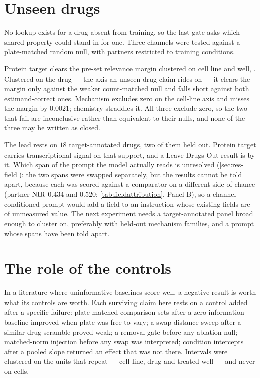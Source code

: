 \section{Unseen drugs}

No lookup exists for a drug absent from training, so the last gate asks which
shared property could stand in for one. Three channels were tested against a
plate-matched random null, with partners restricted to training conditions.

Protein target clears the pre-set relevance margin clustered on cell line and
well, . Clustered on the drug --- the axis an
unseen-drug claim rides on --- it clears the margin only against the weaker
count-matched null and falls short against both estimand-correct ones. Mechanism
excludes zero on the cell-line axis and misses the margin by $0.0021$; chemistry
straddles it. All three exclude zero, so the two that fail are inconclusive
rather than equivalent to their nulls, and none of the three may be written as
closed.

The lead rests on $18$ target-annotated drugs, two of them held out. Protein
target carries transcriptional signal on that support, and a Leave-Drugs-Out
result is \notestablished by it. Which span of the prompt the model actually
reads is unresolved (\cref{sec:res-field}): the two spans were swapped separately, but the results cannot be told apart, because each was scored against a comparator on a different side of chance (partner $\textrm{NIR}$ $0.434$ and $0.520$; \cref{tab:fieldattribution}, Panel B), so a channel-conditioned prompt would add a field
to an instruction whose existing fields are of unmeasured value. The next
experiment needs a target-annotated panel broad enough to cluster on, preferably
with held-out mechanism families, and a prompt whose spans have been told
apart.

\section{The role of the controls}

In a literature where uninformative baselines score well, a negative result is
worth what its controls are worth. Each surviving claim here rests on a control
added after a specific failure: plate-matched comparison sets after a
zero-information baseline improved when plate was free to vary; a swap-distance
sweep after a similar-drug scramble proved weak; a removal gate before any
ablation null; matched-norm injection before any swap was interpreted; condition
intercepts after a pooled slope returned an effect that was not there. Intervals
were clustered on the units that repeat --- cell line, drug and treated well ---
and never on cells.

